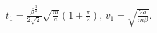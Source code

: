 $t_{1}=\frac{\beta^\frac{3}{2}}{2\sqrt{2}} \sqrt{\frac{m}{a}}(1+\frac{\pi}{2})$, $v_{1}=\sqrt{\frac{2a}{m\beta}}$.
